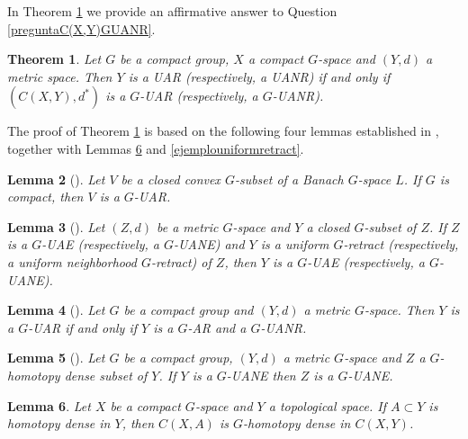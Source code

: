 \documentclass[12pt]{amsart}
\newtheorem{theorem}{Theorem}[section]
\newtheorem{lemma}[theorem]{Lemma}
\theoremstyle{definition}
\begin{document}
	In Theorem \ref{functionC(X,Y)GUANR} we provide an affirmative answer to Question \ref{preguntaC(X,Y)GUANR}.
	
	\begin{theorem}\label{functionC(X,Y)GUANR}
		\rm{Let $G$ be a compact group, $X$ a compact $G$-space and $(Y,d)$ a metric space. Then $Y$ is a UAR (respectively, a UANR) if and only if $(C(X,Y),d^*)$ is a $G$-UAR (respectively, a $G$-UANR).}
	\end{theorem}
	
	The proof of Theorem \ref{functionC(X,Y)GUANR} is based on the following four lemmas established in \cite{A10}, together with Lemmas \ref{functionhomotopydense} and \ref{ejemplouniformretract}.
	
	\begin{lemma}[\cite{A10}]\label{UAE grupo compacto no Lie}
		\rm{Let $V$ be a closed convex $G$-subset of a Banach $G$-space $L$. If $G$ is compact, then $V$ is a $G$-UAR.} 
	\end{lemma}
	
	
	\begin{lemma}[\cite{A10}]\label{retractuniform}
		\rm{Let $(Z,d)$ be a metric $G$-space and $Y$ a closed $G$-subset of $Z$. If $Z$ is a $G$-UAE (respectively, a $G$-UANE) and $Y$ is a uniform $G$-retract (respectively, a uniform neighborhood $G$-retract) of $Z$, then $Y$ is a $G$-UAE (respectively, a $G$-UANE).}
	\end{lemma}
	
	\begin{lemma}[\cite{A10}]\label{G-AR+G-UANR=G-UAR}
		\rm{Let $G$ be a compact group and $(Y,d)$ a metric $G$-space. Then $Y$ is a $G$-UAR if and only if $Y$ is a $G$-AR and a $G$-UANR.}
	\end{lemma}
	
	\begin{lemma}[\cite{A10}]\label{G-UANRpreserveHD}
		\rm{Let $G$ be a compact group, $(Y,d)$ a metric $G$-space and  $Z$  a $G$-homotopy dense subset of $Y$. If $Y$ is a $G$-UANE then $Z$ is a $G$-UANE.}
	\end{lemma}
	
	\begin{lemma}\label{functionhomotopydense}
		\rm{Let $X$ be a compact $G$-space and $Y$ a topological space. If $A\subset Y$ is homotopy dense in $Y$, then $C(X,A)$ is $G$-homotopy dense in $C(X,Y)$.}
	\end{lemma}
	
\end{document}

